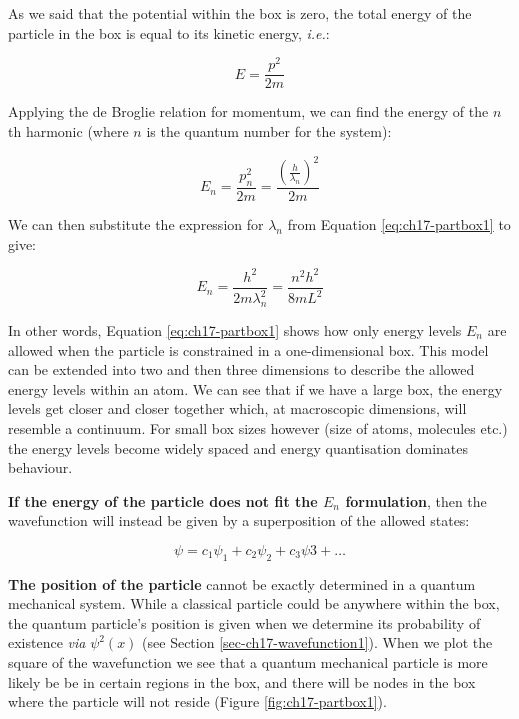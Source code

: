 \documentclass[
]{book}
\begin{document}
As we said that the potential within the box is zero, the total energy of the particle in the box is equal to its kinetic energy, \emph{i.e.}:

\begin{equation}
E = \frac{p^2}{2m}
\end{equation}

Applying the de Broglie relation for momentum, we can find the energy of the \(n\)th harmonic (where \(n\) is the quantum number for the system):

\begin{equation}
E_n = \frac{p_n^2}{2m} = \frac{\left(\frac{h}{\lambda_n}\right)^2}{2m}
\end{equation}

We can then substitute the expression for \(\lambda_n\) from Equation \eqref{eq:ch17-partbox1} to give:

\begin{equation}
E_n = \frac{h^2}{2m\lambda_n^2} = \frac{n^2 h^2}{8mL^2}
\label{eq:ch17-partbox2}
\end{equation}

In other words, Equation \eqref{eq:ch17-partbox1} shows how only energy levels \(E_n\) are allowed when the particle is constrained in a one-dimensional box. This model can be extended into two and then three dimensions to describe the allowed energy levels within an atom. We can see that if we have a large box, the energy levels get closer and closer together which, at macroscopic dimensions, will resemble a continuum. For small box sizes however (size of atoms, molecules etc.) the energy levels become widely spaced and energy quantisation dominates behaviour.

\textbf{If the energy of the particle does not fit the \(E_n\) formulation}, then the wavefunction will instead be given by a superposition of the allowed states:

\begin{equation}
\psi = c_1\psi_1 + c_2\psi_2 + c_3\psi3 + \dots
\end{equation}

\textbf{The position of the particle} cannot be exactly determined in a quantum mechanical system. While a classical particle could be anywhere within the box, the quantum particle's position is given when we determine its probability of existence \emph{via} \(\psi^2(x)\) (see Section \ref{sec-ch17-wavefunction1}). When we plot the square of the wavefunction we see that a quantum mechanical particle is more likely be be in certain regions in the box, and there will be nodes in the box where the particle will not reside (Figure \ref{fig:ch17-partbox1}).
\end{document}
